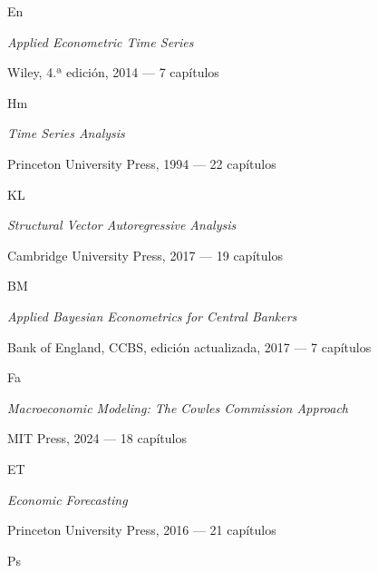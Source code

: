 \documentclass[11pt,a4paper]{article}
\newcommand{\etiqueta}[2]{%
  {\setlength{\fboxsep}{1.4pt}\colorbox{#1}{\sffamily\bfseries\color{white}\strut#2}}}
\begin{document}
\begin{titlepage}
\vspace{0.3cm}
{\large\etiqueta{colorEn}{En} \par}
{\normalsize \emph{\color{colorEn}Applied Econometric Time Series}\par}
{\small\color{tonoPizarra} Wiley, 4.ª edición, 2014 --- 7 capítulos\par}
\vspace{0.12cm}
{\large\etiqueta{colorHm}{Hm} \par}
{\normalsize \emph{\color{colorHm}Time Series Analysis}\par}
{\small\color{tonoPizarra} Princeton University Press, 1994 --- 22 capítulos\par}
\vspace{0.12cm}
{\large\etiqueta{colorKL}{KL} \par}
{\normalsize \emph{\color{colorKL}Structural Vector Autoregressive Analysis}\par}
{\small\color{tonoPizarra} Cambridge University Press, 2017 --- 19 capítulos\par}
\vspace{0.12cm}
{\large\etiqueta{colorBM}{BM} \par}
{\normalsize \emph{\color{colorBM}Applied Bayesian Econometrics for Central Bankers}\par}
{\small\color{tonoPizarra} Bank of England, CCBS, edición actualizada, 2017 --- 7 capítulos\par}
\vspace{0.12cm}
{\large\etiqueta{colorFa}{Fa} \par}
{\normalsize \emph{\color{colorFa}Macroeconomic Modeling: The Cowles Commission Approach}\par}
{\small\color{tonoPizarra} MIT Press, 2024 --- 18 capítulos\par}
\vspace{0.12cm}
{\large\etiqueta{colorET}{ET} \par}
{\normalsize \emph{\color{colorET}Economic Forecasting}\par}
{\small\color{tonoPizarra} Princeton University Press, 2016 --- 21 capítulos\par}
\vspace{0.12cm}
{\large\etiqueta{colorPs}{Ps} \par}

\end{titlepage}
\end{document}
